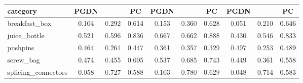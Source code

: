 \setlength{\tabcolsep}{3pt}
\begin{tabular}{@{}lccccccccc@{}}
\toprule
category & PGDN & \draem{} & PC & PGDN & \draem{} & PC & PGDN & \draem{} & PC \\
\midrule
breakfast\_box & 0.104 & 0.292 & 0.614 & 0.153 & 0.360 & 0.628 & 0.051 & 0.210 & 0.646 \\
juice\_bottle & 0.521 & 0.596 & 0.836 & 0.667 & 0.662 & 0.888 & 0.430 & 0.546 & 0.833 \\
pushpins & 0.464 & 0.261 & 0.447 & 0.361 & 0.357 & 0.329 & 0.497 & 0.253 & 0.489 \\
screw\_bag & 0.474 & 0.455 & 0.605 & 0.537 & 0.685 & 0.743 & 0.449 & 0.361 & 0.558 \\
splicing\_connectors & 0.058 & 0.727 & 0.588 & 0.103 & 0.780 & 0.629 & 0.048 & 0.714 & 0.583 \\
\bottomrule
\end{tabular}
